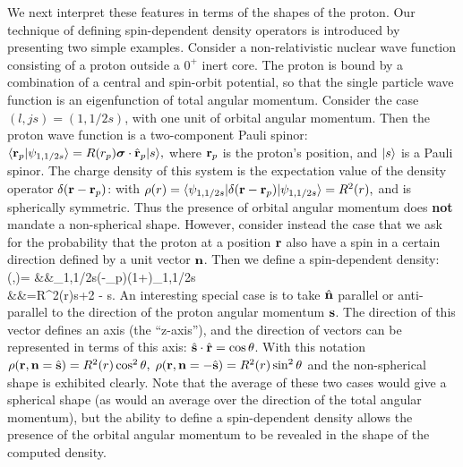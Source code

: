  We next 
interpret these features in terms of the shapes of the 
proton.  Our technique of defining  spin-dependent density operators 
is  introduced by presenting
 two simple examples. Consider a non-relativistic nuclear wave function
consisting of a proton outside a $0^+$ inert 
core. The proton is bound by a combination of a central and 
spin-orbit potential, so that the single
particle wave function is an eigenfunction of total angular momentum.
Consider the case $(l,js)=(1,1/2s)$, with one unit of orbital angular momentum.
 Then the proton wave function is
a two-component Pauli spinor:
$\langle{\bf r}_p \vert\psi_{1,1/2s}\rangle=R(r_p)\mbox{\boldmath $\sigma$}\cdot\hat{{\bf r}}_p\vert s\rangle,$
where ${\bf r}_p$ is the proton's position, and $\vert s \rangle$ is
a  Pauli spinor. The charge density of this  system is the 
expectation value of the density operator $\delta({\bf r}-{\bf r}_p)$:
with $
\rho(r)=\langle\psi_{1,1/2s}\vert\delta({\bf r}-{\bf r}_p)\vert \psi_{1,1/2s}\rangle=R^2(r),$
and is spherically symmetric. Thus the presence of orbital angular momentum
does {\bf not} mandate a non-spherical shape.
However, consider instead the case that we ask for  the probability that 
the proton at a position ${\bf r}$ also 
have a spin in a certain direction defined by a unit vector ${{\bf n}}$.
 Then we define a spin-dependent  density:
\bea \rho(\bfr,{\bfn})=\bb
&&\psi_{1,1/2s}\vert\delta(\bfr-\bfr_p){(1+\boldsigma\cdot{\bfn})}\vert \psi_{1,1/2s}\kk\nonumber\\
&&={R^2(r)}\bb  s+2\boldsigma\cdot \hat{\bfr}\;{\bfn} \cdot \hat{\bfr} -\boldsigma\cdot
{\bfn}\vert s\kk.\eea
An interesting special case is to take $\hat{{\bf n}}$
 parallel or anti-parallel to
the direction of the proton angular momentum 
${\bf s}$. The direction of this vector defines an axis (the ``z-axis''), and
 the direction of vectors can be represented in terms of this axis:
$\hat{{\bf s}}\cdot\hat{{\bf r}}=\cos\theta$. With this notation
$ \rho({\bf r},{{\bf n}}=\hat{{\bf s}})={R^2(r)}\cos^2\theta,\;
 \rho({\bf r},{{\bf n}}=-\hat{{\bf s}}  )={R^2(r)}\sin^2\theta$ and
 the non-spherical shape is exhibited clearly. 
Note that the average of these
two cases  would give 
a spherical shape (as would an average over the direction of the total 
angular momentum),
 but the ability to
define a spin-dependent density allows 
the presence of the orbital angular momentum to be revealed in
 the shape of the computed density.

